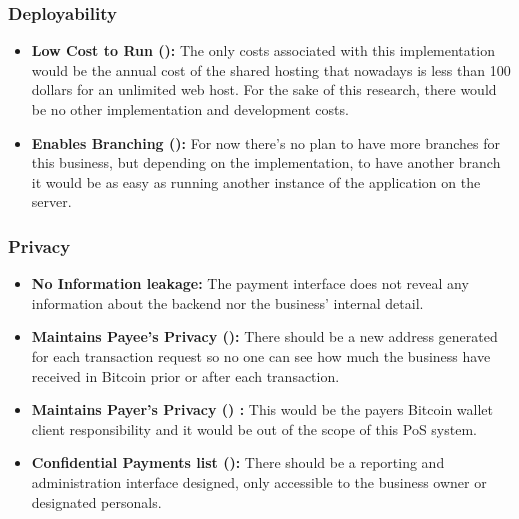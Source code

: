 \subsubsection{Deployability}
\begin{itemize}

\item \textbf{Low Cost to Run (\prt): } The only costs associated with this implementation would be the annual cost of the shared hosting that nowadays is less than 100 dollars for an unlimited web host. For the sake of this research, there would be no other implementation and development costs.

\item \textbf{Enables Branching (\prt): } For now there's no plan to have more branches for this business, but depending on the implementation, to have another branch it would be as easy as running another instance of the application on the server.

\end{itemize}
 
\subsubsection{Privacy} 
\begin{itemize}

\item \textbf{No Information leakage: } The payment interface does not reveal any information about the backend nor the business' internal detail.

\item \textbf{Maintains Payee's Privacy (\full): } There should be a new address generated for each transaction request so no one can see how much the business have received in Bitcoin prior or after each transaction.

\item \textbf{Maintains Payer's Privacy (\prt) : } This would be the payers Bitcoin wallet client responsibility and it would be out of the scope of this PoS system.

\item \textbf{Confidential Payments list (\full): } There should be a reporting and administration interface designed, only accessible to the business owner or designated personals.

\end{itemize}
